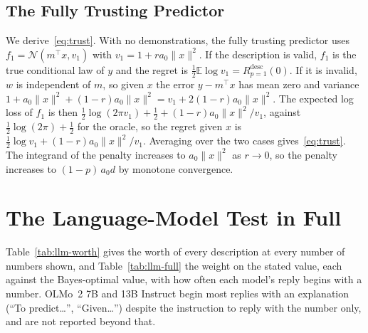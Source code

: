 \documentclass{article}
\newcommand{\E}{\mathbb{E}}
\begin{document}
\subsection{The Fully Trusting Predictor}\label{app:trust}
We derive~\eqref{eq:trust}. With no demonstrations, the fully trusting predictor uses $f_1 = \mathcal{N}(m^\top x, v_1)$ with $v_1 = 1 + r a_0 \|x\|^2$. If the description is valid, $f_1$ is the true conditional law of $y$ and the regret is $\tfrac12 \E \log v_1 = R^{\mathrm{desc}}_{p=1}(0)$. If it is invalid, $w$ is independent of $m$, so given $x$ the error $y - m^\top x$ has mean zero and variance $1 + a_0\|x\|^2 + (1-r)a_0\|x\|^2 = v_1 + 2(1-r)a_0\|x\|^2$. The expected log loss of $f_1$ is then $\tfrac12 \log(2\pi v_1) + \tfrac12 + (1-r)a_0\|x\|^2/v_1$, against $\tfrac12 \log(2\pi) + \tfrac12$ for the oracle, so the regret given $x$ is $\tfrac12 \log v_1 + (1-r)a_0\|x\|^2/v_1$. Averaging over the two cases gives~\eqref{eq:trust}. The integrand of the penalty increases to $a_0\|x\|^2$ as $r \to 0$, so the penalty increases to $(1-p)\,a_0 d$ by monotone convergence.

\section{The Language-Model Test in Full}\label{app:llm}
Table~\ref{tab:llm-worth} gives the worth of every description at every number of numbers shown, and Table~\ref{tab:llm-full} the weight on the stated value, each against the Bayes-optimal value, with how often each model's reply begins with a number. OLMo~2 7B and 13B Instruct begin most replies with an explanation (``To predict\ldots'', ``Given\ldots'') despite the instruction to reply with the number only, and are not reported beyond that.

\begin{table}[t]
\centering\scriptsize
\setlength{\tabcolsep}{2.5pt}
\caption{Worth of a description in demonstrations, model/Bayes-optimal, for every condition and number of numbers shown ($2{,}000$ tasks). ``Number'' is the share of replies that begin with a three-digit number, averaged over $n$; a cell is in italics where that share is below one half at that $n$. $> 64$: the model's error with the description is below its error with $64$ numbers and no description.}
\label{tab:llm-worth}
\vspace{3pt}

\end{table}

\begin{table}[t]
\centering\scriptsize
\setlength{\tabcolsep}{2.5pt}
\caption{Weight on the stated value, model/Bayes-optimal, for every condition and number of numbers shown. Italics as in Table~\ref{tab:llm-worth}.}
\label{tab:llm-full}
\vspace{3pt}

\end{table}
\end{document}
